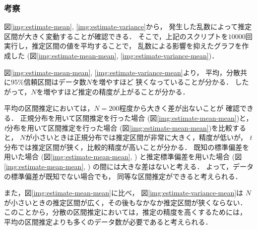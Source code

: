 \documentclass{jsarticle}
\begin{document}
\subsubsection*{考察}
図\ref{img:estimate-mean}, \ref{img:estimate-variance}から，
発生した乱数によって推定区間が大きく変動することが確認できる．
そこで，上記のスクリプトを$10000$回実行し，推定区間の値を平均することで，
乱数による影響を抑えたグラフを作成した
(図\ref{img:estimate-mean-mean}, \ref{img:estimate-variance-mean})．

図\ref{img:estimate-mean-mean}, \ref{img:estimate-variance-mean}より，
平均，分散共に95\%信頼区間はデータ数$N$を増やすほど
狭くなっていることが分かる．
したがって，$N$を増やすほど推定の精度が上がることが分かる．

平均の区間推定においては，$N=200$程度から大きく差が出ないことが
確認できる．
正規分布を用いて区間推定を行った場合
(図\ref{img:estimate-mean-mean})と，
\emph{t}分布を用いて区間推定を行った場合
(図\ref{img:estimate-mean-mean})を比較すると，
$N$が小さいときは正規分布では推定区間が非常に大きく，精度が低いが，
\emph{t}分布では推定区間が狭く，比較的精度が高いことが分かる．
既知の標準偏差を用いた場合
(図\ref{img:estimate-mean-mean},
) と推定標準偏差を用いた場合
(図\ref{img:estimate-mean-mean},
) の間には大きな差はないと考える．
よって，データの標準偏差が既知でない場合でも，
同等な区間推定ができると考えられる．

また，図\ref{img:estimate-mean-mean}に比べ，
図\ref{img:estimate-variance-mean}は
$N$が小さいときの推定区間が広く，その後もなかなか推定区間が狭くならない．
このことから，分散の区間推定においては，推定の精度を高くするためには，
平均の区間推定よりも多くのデータ数が必要であると考えられる．
\end{document}
